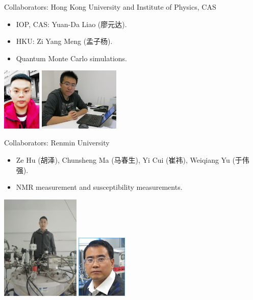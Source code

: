 \documentclass[xcolor=table, aspectratio=1610,ignorenonframetext]{beamer}
\begin{document}
\begin{frame}{Collaborators: Hong Kong University and Institute of Physics, CAS}
\begin{itemize}
	\item IOP, CAS: Yuan-Da Liao (廖元达).
	\item HKU: Zi Yang Meng (孟子杨).
	\item Quantum Monte Carlo simulations.
\end{itemize}
	\begin{center}
		\includegraphics[height=3cm]{../people/yuandaliao}
		\includegraphics[height=3cm]{../people/ziyangmeng}
	\end{center}
\end{frame}

\begin{frame}{Collaborators: Renmin University}
\begin{itemize}
	\item Ze Hu (胡泽), Chunsheng Ma (马春生), Yi Cui (崔祎), Weiqiang Yu (于伟强).
	\item NMR measurement and susceptibility measurements.
\end{itemize}
	\begin{center}
		\includegraphics[height=5cm]{../people/zehu_large}
		\includegraphics[height=3cm]{../people/weiqiangyu}
	\end{center}
\end{frame}
\end{document}
